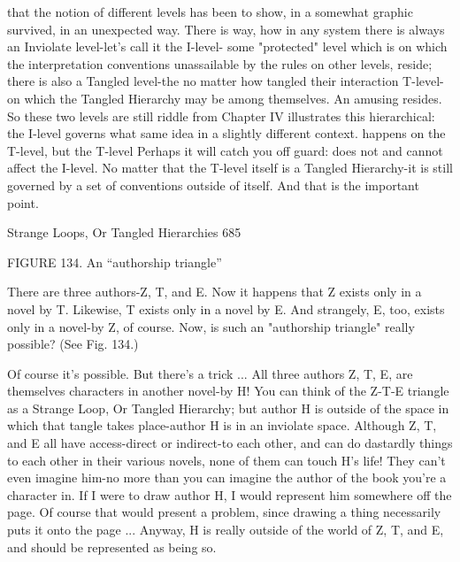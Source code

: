 that the notion of different levels has         been to show, in a somewhat graphic
survived, in an unexpected way. There is        way, how in any system there is always
an Inviolate level-let's call it the I-level-   some "protected" level which is
on which the interpretation conventions         unassailable by the rules on other levels,
reside; there is also a Tangled level-the       no matter how tangled their interaction
T-level-on which the Tangled Hierarchy          may be among themselves. An amusing
resides. So these two levels are still          riddle from Chapter IV illustrates this
hierarchical: the I-level governs what          same idea in a slightly different context.
happens on the T-level, but the T-level         Perhaps it will catch you off guard:
does not and cannot affect the I-level.
No matter that the T-level itself is a
Tangled Hierarchy-it is still governed by
a set of conventions outside of itself.
And that is the important point.

Strange Loops, Or Tangled Hierarchies                                                  685

                                                FIGURE 134. An “authorship triangle”




  There are three authors-Z, T, and E. Now it happens that Z exists only in a novel by
  T. Likewise, T exists only in a novel by E. And strangely, E, too, exists only in a
  novel-by Z, of course. Now, is such an "authorship triangle" really possible? (See
  Fig. 134.)

Of course it's possible. But there's a trick ... All three authors Z, T, E, are themselves
characters in another novel-by H! You can think of the Z-T-E triangle as a Strange Loop,
Or Tangled Hierarchy; but author H is outside of the space in which that tangle takes
place-author H is in an inviolate space. Although Z, T, and E all have access-direct or
indirect-to each other, and can do dastardly things to each other in their various novels,
none of them can touch H's life! They can't even imagine him-no more than you can
imagine the author of the book you're a character in. If I were to draw author H, I would
represent him somewhere off the page. Of course that would present a problem, since
drawing a thing necessarily puts it onto the page ... Anyway, H is really outside of the
world of Z, T, and E, and should be represented as being so.

